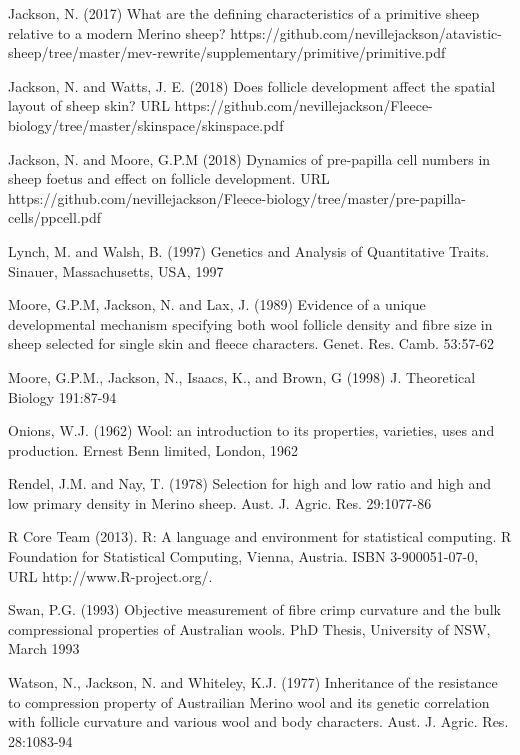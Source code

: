 \documentclass[titlepage]{article}  %
\begin{document}
\begin{thebibliography}{99}
Jackson, N. (2017) What are the defining characteristics of a primitive sheep relative to a modern Merino sheep? https://github.com/nevillejackson/atavistic-sheep/tree/master/mev-rewrite/supplementary/primitive/primitive.pdf

Jackson, N. and Watts, J. E. (2018) Does follicle development affect the spatial layout of sheep skin? URL https://github.com/nevillejackson/Fleece-biology/tree/master/skinspace/skinspace.pdf

Jackson, N. and Moore, G.P.M (2018) Dynamics of pre-papilla cell numbers in sheep foetus and effect on follicle development. URL https://github.com/nevillejackson/Fleece-biology/tree/master/pre-papilla-cells/ppcell.pdf

Lynch, M. and Walsh, B. (1997) Genetics and Analysis of Quantitative Traits. Sinauer, Massachusetts, USA, 1997

Moore, G.P.M, Jackson, N. and Lax, J. (1989) Evidence of a unique developmental mechanism specifying both wool follicle density and fibre size in sheep selected for single skin and fleece characters. Genet. Res. Camb.  53:57-62

Moore, G.P.M., Jackson, N., Isaacs, K., and Brown, G (1998) J. Theoretical Biology 191:87-94


Onions, W.J. (1962) Wool: an introduction to its properties, varieties, uses
     and production. Ernest Benn limited, London, 1962

Rendel, J.M. and Nay, T. (1978) Selection for high and low ratio and high 
    and low primary density in Merino sheep. 
    Aust. J. Agric. Res. 29:1077-86

R Core Team (2013). R: A language and environment for statistical
  computing. R Foundation for Statistical Computing, Vienna, Austria.
  ISBN 3-900051-07-0, URL http://www.R-project.org/.



Swan, P.G. (1993) Objective measurement of fibre crimp curvature and the bulk compressional properties of Australian wools. PhD Thesis, University of NSW, March 1993 

Watson, N., Jackson, N. and Whiteley, K.J. (1977) Inheritance of the resistance
    to compression property of Austrailian Merino wool and its genetic 
    correlation with follicle curvature and various wool and body 
    characters. Aust. J. Agric. Res. 28:1083-94


\end{thebibliography}
\end{document}
